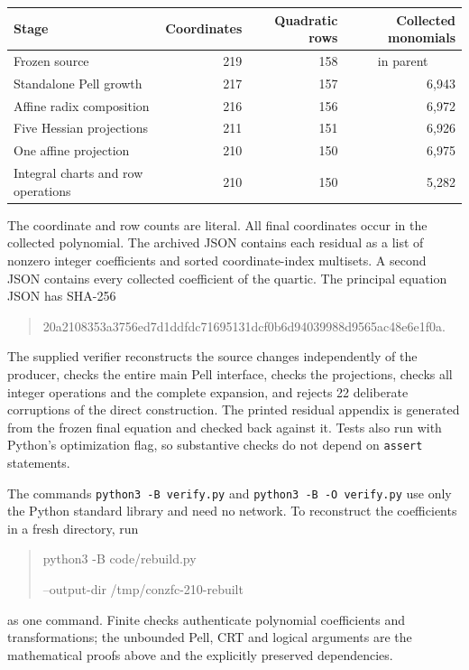 \documentclass[11pt,a4paper]{article}
\theoremstyle{remark}\newtheorem{remark}[theorem]{Remark}
\begin{document}
\begin{center}\small
\begin{tabular}{lrrr}
\toprule Stage & Coordinates & Quadratic rows & Collected monomials\\
\midrule Frozen source &219&158&\multicolumn{1}{c}{in parent}\\
Standalone Pell growth &217&157&6,943\\
Affine radix composition &216&156&6,972\\
Five Hessian projections &211&151&6,926\\
One affine projection &210&150&6,975\\
Integral charts and row operations &210&150&5,282\\
\bottomrule
\end{tabular}
\end{center}

The coordinate and row counts are literal. All final coordinates occur in
the collected polynomial. The archived JSON contains each residual as a
list of nonzero integer coefficients and sorted coordinate-index multisets.
A second JSON contains every collected coefficient of the quartic. The
principal equation JSON has SHA-256
\begin{quote}\ttfamily\small
20a2108353a3756ed7d1ddfdc71695131dcf0b6d94039988d9565ac48e6e1f0a.
\end{quote}

The supplied verifier reconstructs the source changes independently of the
producer, checks the entire main Pell interface, checks the projections,
checks all integer operations and the complete expansion, and rejects 22
deliberate corruptions of the direct construction. The printed residual
appendix is generated from the frozen final equation and checked back against
it. Tests also run with Python's optimization flag, so substantive checks do
not depend on \texttt{assert} statements.

The commands \texttt{python3 -B verify.py} and
\texttt{python3 -B -O verify.py} use only the Python standard library and
need no network. To reconstruct the coefficients in a fresh directory, run
\begin{quote}\small\ttfamily
python3 -B code/rebuild.py\par
\hspace{1em}--output-dir /tmp/conzfc-210-rebuilt
\end{quote}
as one command.
Finite checks authenticate polynomial coefficients and transformations; the
unbounded Pell, CRT and logical arguments are the mathematical proofs above
and the explicitly preserved dependencies.
\end{document}
